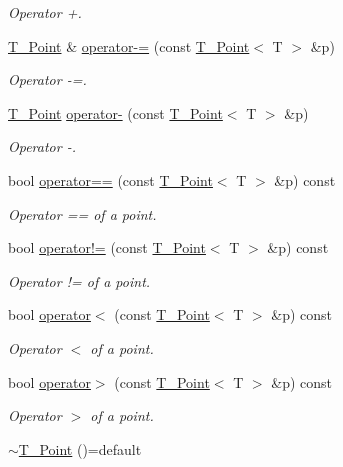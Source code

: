 \begin{DoxyCompactItemize}
\begin{DoxyCompactList}\small\item\em Operator +. \end{DoxyCompactList}\item 
\hyperlink{classT__Point}{T\+\_\+\+Point} \& \hyperlink{classT__Point_aa438de3090999e1f24f0de58dc5171a0}{operator-\/=} (const \hyperlink{classT__Point}{T\+\_\+\+Point}$<$ T $>$ \&p)
\begin{DoxyCompactList}\small\item\em Operator -\/=. \end{DoxyCompactList}\item 
\hyperlink{classT__Point}{T\+\_\+\+Point} \hyperlink{classT__Point_a4a3671d0a9763b3e749c799294ebb1ca}{operator-\/} (const \hyperlink{classT__Point}{T\+\_\+\+Point}$<$ T $>$ \&p)
\begin{DoxyCompactList}\small\item\em Operator -\/. \end{DoxyCompactList}\item 
bool \hyperlink{classT__Point_a83c15f53049523cc75c23350ceb4832a}{operator==} (const \hyperlink{classT__Point}{T\+\_\+\+Point}$<$ T $>$ \&p) const
\begin{DoxyCompactList}\small\item\em Operator == of a point. \end{DoxyCompactList}\item 
bool \hyperlink{classT__Point_ab92f1605c6f5008b42105b4c7a7fc1b2}{operator!=} (const \hyperlink{classT__Point}{T\+\_\+\+Point}$<$ T $>$ \&p) const
\begin{DoxyCompactList}\small\item\em Operator != of a point. \end{DoxyCompactList}\item 
bool \hyperlink{classT__Point_a95cb559fe5888b44481f6ad3aebabefe}{operator$<$} (const \hyperlink{classT__Point}{T\+\_\+\+Point}$<$ T $>$ \&p) const
\begin{DoxyCompactList}\small\item\em Operator $<$ of a point. \end{DoxyCompactList}\item 
bool \hyperlink{classT__Point_a0a9956de8ab7c8dccf35b78c43aedefd}{operator$>$} (const \hyperlink{classT__Point}{T\+\_\+\+Point}$<$ T $>$ \&p) const
\begin{DoxyCompactList}\small\item\em Operator $>$ of a point. \end{DoxyCompactList}\item 
\hyperlink{classT__Point_aeab73ddfa664bfe9ac4ce92982c1c36b}{$\sim$\+T\+\_\+\+Point} ()=default
\end{DoxyCompactItemize}
